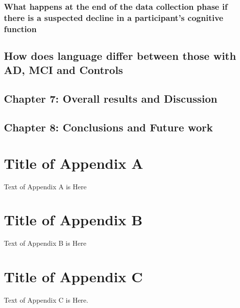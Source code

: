 \documentclass{article}
\begin{document}
\subsubsection{What happens at the end of the data collection phase if there is a suspected decline in a participant's cognitive function}
\subsection{How does language differ between those with AD, MCI and Controls}
\subsection{Chapter 7: Overall results and Discussion}
\subsection{Chapter 8: Conclusions and Future work}





\appendix
\section{Title of Appendix A}
Text of Appendix A is Here

\section{Title of Appendix B}
Text of Appendix B is Here

\section{Title of Appendix C}
Text of Appendix C is Here.
\end{document}
